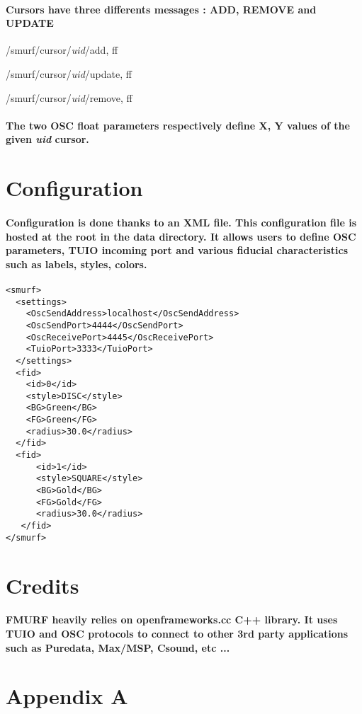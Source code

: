 \documentclass[10pt,a4paper]{book}
\begin{document}
\paragraph{Cursors have three differents messages : ADD, REMOVE and UPDATE}

\begin{list}{OSC:}{}
\item /smurf/cursor/\textit{uid}/add, ff
\item /smurf/cursor/\textit{uid}/update, ff
\item /smurf/cursor/\textit{uid}/remove, ff
\end{list}

\paragraph{The two OSC float parameters respectively define X, Y values of the given \textit{uid} cursor. }

\section{Configuration}
\paragraph{Configuration is done thanks to an XML file. This configuration file is hosted at the root in the data directory. It allows users to define OSC parameters, TUIO incoming port and various fiducial characteristics such as labels, styles, colors.}

\begin{lstlisting}
<smurf>
  <settings>
    <OscSendAddress>localhost</OscSendAddress>
    <OscSendPort>4444</OscSendPort>
    <OscReceivePort>4445</OscReceivePort>
    <TuioPort>3333</TuioPort>
  </settings>
  <fid>
    <id>0</id>
    <style>DISC</style>
    <BG>Green</BG>
    <FG>Green</FG>
    <radius>30.0</radius>
  </fid>
  <fid>
	  <id>1</id>
	  <style>SQUARE</style>
	  <BG>Gold</BG>
	  <FG>Gold</FG>
	  <radius>30.0</radius>
   </fid>
</smurf>
\end{lstlisting}

\section{Credits}
\paragraph{FMURF heavily relies on openframeworks.cc C++ library. It uses TUIO and OSC protocols to connect to other 3rd party applications such as Puredata, Max/MSP, Csound, etc ...}

\section{Appendix A}
\end{document}
